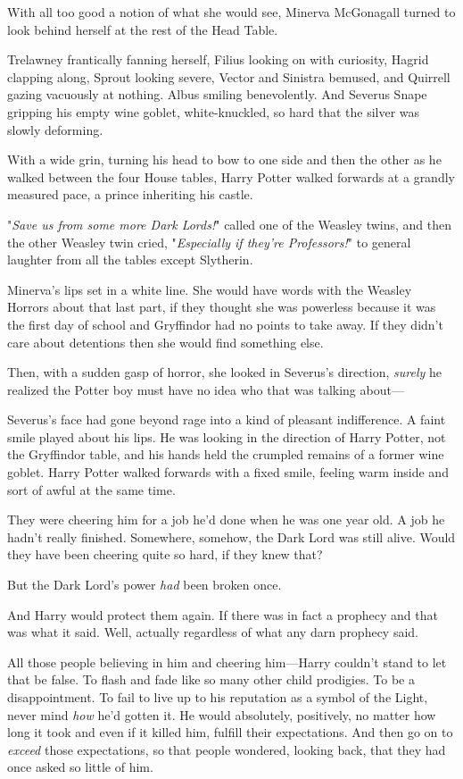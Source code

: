 With all too good a notion of what she would see, Minerva McGonagall turned to
look behind herself at the rest of the Head Table.

Trelawney frantically fanning herself, Filius looking on with curiosity, Hagrid
clapping along, Sprout looking severe, Vector and Sinistra bemused, and
Quirrell gazing vacuously at nothing. Albus smiling benevolently. And Severus
Snape gripping his empty wine goblet, white-knuckled, so hard that the silver
was slowly deforming.

With a wide grin, turning his head to bow to one side and then the other as he
walked between the four House tables, Harry Potter walked forwards at a grandly
measured pace, a prince inheriting his castle.

"\emph{Save us from some more Dark Lords!}" called one of the Weasley twins,
and then the other Weasley twin cried, "\emph{Especially if they're
Professors!}" to general laughter from all the tables except Slytherin.

Minerva's lips set in a white line. She would have words with the Weasley
Horrors about that last part, if they thought she was powerless because it was
the first day of school and Gryffindor had no points to take away. If they
didn't care about detentions then she would find something else.

Then, with a sudden gasp of horror, she looked in Severus's direction,
\emph{surely} he realized the Potter boy must have no idea who that was talking
about---

Severus's face had gone beyond rage into a kind of pleasant indifference. A
faint smile played about his lips. He was looking in the direction of Harry
Potter, not the Gryffindor table, and his hands held the crumpled remains of a
former wine goblet.
\sbreak
Harry Potter walked forwards with a fixed smile, feeling warm inside and sort
of awful at the same time.

They were cheering him for a job he'd done when he was one year old. A job he
hadn't really finished. Somewhere, somehow, the Dark Lord was still alive.
Would they have been cheering quite so hard, if they knew that?

But the Dark Lord's power \emph{had} been broken once.

And Harry would protect them again. If there was in fact a prophecy and that
was what it said. Well, actually regardless of what any darn prophecy said.

All those people believing in him and cheering him---Harry couldn't stand to
let that be false. To flash and fade like so many other child prodigies. To be
a disappointment. To fail to live up to his reputation as a symbol of the
Light, never mind \emph{how} he'd gotten it. He would absolutely, positively,
no matter how long it took and even if it killed him, fulfill their
expectations. And then go on to \emph{exceed} those expectations, so that
people wondered, looking back, that they had once asked so little of him.

